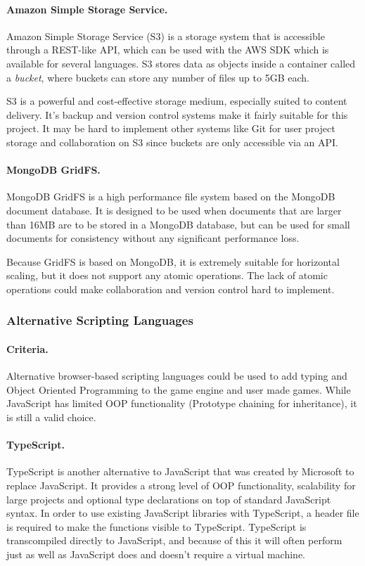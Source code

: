 \documentclass[a4paper, 12pt]{article}
\begin{document}
\paragraph{Amazon Simple Storage Service.}
Amazon Simple Storage Service (S3) is a storage system that is accessible through a REST-like API, which can be used with the AWS SDK which is available for several languages.\cite{awss3} S3 stores data as objects inside a container called a \emph{bucket}, where buckets can store any number of files up to 5GB each.

S3 is a powerful and cost-effective storage medium, especially suited to content delivery. It's backup and version control systems make it fairly suitable for this project.\cite{awss3} It may be hard to implement other systems like Git for user project storage and collaboration on S3 since buckets are only accessible via an API.

\paragraph{MongoDB GridFS.}
MongoDB GridFS is a high performance file system based on the MongoDB document database. It is designed to be used when documents that are larger than 16MB are to be stored in a MongoDB database, but can be used for small documents for consistency without any significant performance loss.\cite{gridfs}

Because GridFS is based on MongoDB, it is extremely suitable for horizontal scaling, but it does not support any atomic operations.\cite{gridfsatomic} The lack of atomic operations could make collaboration and version control hard to implement.

\subsubsection{Alternative Scripting Languages}
\paragraph{Criteria.}
Alternative browser-based scripting languages could be used to add typing and Object Oriented Programming to the game engine and user made games. While JavaScript has limited OOP functionality (Prototype chaining for inheritance), it is still a valid choice.

\paragraph{TypeScript.}
TypeScript is another alternative to JavaScript that was created by Microsoft to replace JavaScript. It provides a strong level of OOP functionality, scalability for large projects and optional type declarations on top of standard JavaScript syntax.\cite{typescript} In order to use existing JavaScript libraries with TypeScript, a header file is required to make the functions visible to TypeScript. TypeScript is transcompiled directly to JavaScript, and because of this it will often perform just as well as JavaScript does and doesn't require a virtual machine.
\end{document}

